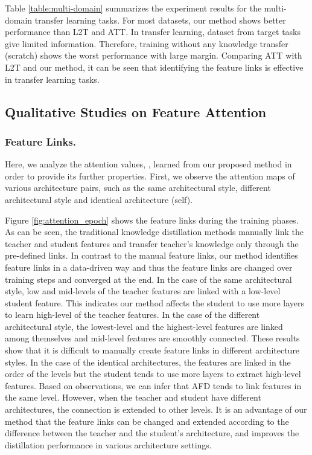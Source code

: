 Table \ref{table:multi-domain} summarizes the experiment results for the multi-domain transfer learning tasks. For most datasets, our method shows better performance than L2T and ATT. In transfer learning, dataset from target tasks give limited information. Therefore, training without any knowledge transfer (scratch) shows the worst performance with large margin. Comparing ATT with L2T and our method, it can be seen that identifying the feature links is effective in transfer learning tasks. 


\subsection{Qualitative Studies on Feature Attention}

\subsubsection{Feature Links.}
Here, we analyze the attention values, , learned from our proposed method in order to provide its further properties. First, we observe the attention maps of various architecture pairs, such as the same architectural style, different architectural style and identical architecture (self).

Figure \ref{fig:attention_epoch} shows the feature links  during the training phases. As can be seen, the traditional knowledge distillation methods manually link the teacher and student features and transfer teacher's knowledge only through the pre-defined links. In contrast to the manual feature links, our method identifies feature links in a data-driven way and thus the feature links  are changed over training steps and converged at the end. In the case of the same architectural style, low and mid-levels of the teacher features are linked with a low-level student feature. This indicates our method affects the student to use more layers to learn high-level of the teacher features. 
In the case of the different architectural style, the lowest-level and the highest-level features are linked among themselves and mid-level features are smoothly connected.
These results show that it is difficult to manually create feature links in different architecture styles.
In the case of the identical architectures, the features are linked in the order of the levels but the student tends to use more layers to extract high-level features. 
Based on observations, we can infer that AFD tends to link features in the same level.
However, when the teacher and student have different architectures, the connection is extended to other levels.
It is an advantage of our method that the feature links can be changed and extended according to the difference between the teacher and the student's architecture, and improves the distillation performance in various architecture settings.

